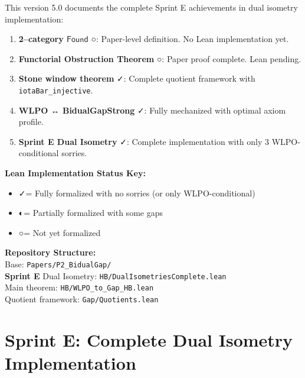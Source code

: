 \documentclass[11pt]{article}
\theoremstyle{definition}
\theoremstyle{remark}
\newcommand{\leanok}{\textcolor{green!70!black}{✓}}
\newcommand{\leanpartial}{\textcolor{orange!70!black}{◐}}
\newcommand{\leanpending}{\textcolor{red!70!black}{○}}
\newcommand{\leanloc}[1]{\texttt{\footnotesize\color{blue!60!black}#1}}
\newcommand{\sprintE}{\textcolor{orange!70!black}{\textbf{Sprint E}}}
\newcommand{\Found}{\mathsf{Found}}
\begin{document}
This version 5.0 documents the complete Sprint E achievements in dual isometry implementation:

\begin{enumerate}
\item \textbf{2--category \(\Found\)} \leanpending: Paper-level definition. No Lean implementation yet.

\item \textbf{Functorial Obstruction Theorem} \leanpending: Paper proof complete. Lean pending.

\item \textbf{Stone window theorem} \leanok: Complete quotient framework with \texttt{iotaBar\_injective}.

\item \textbf{WLPO ↔ BidualGapStrong} \leanok: Fully mechanized with optimal axiom profile.

\item \textbf{\sprintE{} Dual Isometry} \leanok: Complete implementation with only 3 WLPO-conditional sorries.
\end{enumerate}

\begin{mdframed}[style=leanbox]
\textbf{Lean Implementation Status Key:}
\begin{itemize}
\item \leanok = Fully formalized with no sorries (or only WLPO-conditional)
\item \leanpartial = Partially formalized with some gaps
\item \leanpending = Not yet formalized
\end{itemize}

\textbf{Repository Structure:}\\
Base: \leanloc{Papers/P2\_BidualGap/}\\
\sprintE{} Dual Isometry: \leanloc{HB/DualIsometriesComplete.lean}\\
Main theorem: \leanloc{HB/WLPO\_to\_Gap\_HB.lean}\\
Quotient framework: \leanloc{Gap/Quotients.lean}
\end{mdframed}

\section{Sprint E: Complete Dual Isometry Implementation}\label{sec:sprint-e}
\end{document}
